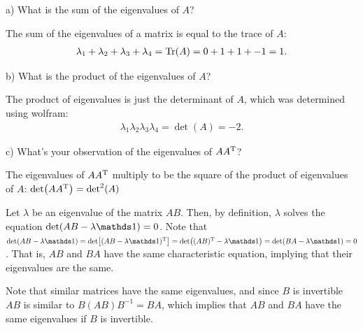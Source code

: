 \def\duedate{12/08/22}
\def\HWnum{4}



    

a) What is the sum of the eigenvalues of $A$?

The sum of the eigenvalues of a matrix is equal to the trace of $A$:
\begin{eqnarray}
    \lambda_{1} + \lambda_{2} + \lambda_{3} + \lambda_{4} = \Tr(A) = 0 + 1 + 1 + -1 = 1
.\end{eqnarray}

b) What is the product of the eigenvalues of $A$?

The product of eigenvalues is just the determinant of $A$, which was determined using wolfram:
\begin{eqnarray}
    \lambda_1\lambda_2\lambda_3\lambda_4 = \det(A) = -2
.\end{eqnarray}


c) What's your observation of the eigenvalues of $A A^{\rm T}$?

The eigenvalues of $A A^{\rm T}$ multiply to be the square of the product of eigenvalues of $A$: $\det(A A^{\rm T}) = \det^2(A)$


Let $\lambda$ be an eigenvalue of the matrix $AB$.
Then, by definition, $\lambda$ solves the equation $\det(AB - \lambda \id) = 0$.
Note that $\det(AB - \lambda \id) = \det[(AB - \lambda \id)^{\rm T}] = \det((AB)^{\rm T} - \lambda \id) = \det(BA - \lambda\id) = 0$.
That is, $AB$ and $BA$ have the same characteristic equation, implying that their eigenvalues are the same.


Note that similar matrices have the same eigenvalues, and since $B$ is invertible $AB$ is similar to $B(AB)B^{-1} = BA$, which implies that $AB$ and $BA$ have the same eigenvalues if $B$ is invertible.

